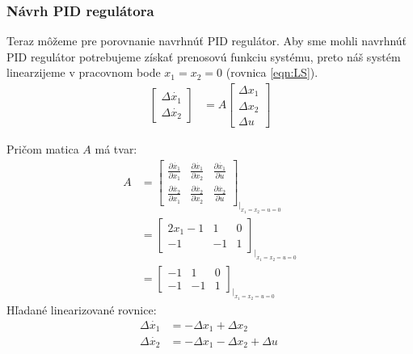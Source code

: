 \documentclass[../main.tex]{subfiles}
\begin{document}
\subsubsection*{Návrh PID regulátora}
Teraz môžeme pre porovnanie navrhnúť PID regulátor. Aby sme mohli navrhnúť PID regulátor potrebujeme získať prenosovú funkciu systému, preto náš systém linearzijeme v pracovnom bode $x_1 = x_2 = 0$ (rovnica \ref{eqn:LS}).
\begin{equation}
\begin{split} 
\begin{bmatrix} \Delta \dot{x_1} \\ \Delta \dot{x_2} \end{bmatrix}  & = A\begin{bmatrix} \Delta {x_1} \\ \Delta {x_2} \\ \Delta u \end{bmatrix}
 \end{split}
 \label{eqn:LS}
\end{equation}	

Pričom matica $A$ má tvar:
\begin{equation}
\begin{aligned} 
 A  & = \begin{bmatrix} \frac{\partial \dot{x_1}}{\partial x_1}& \frac{\partial \dot{x_1}}{\partial x_2}& \frac{\partial \dot{x_1}}{\partial u} \\ \frac{\partial \dot{x_2}}{\partial x_1}&\frac{\partial \dot{x_2}}{\partial x_2} & \frac{\partial \dot{x_2}}{\partial u}\end{bmatrix}_{|_{x_1 = x_2 = u = 0}} \\
 & = \begin{bmatrix} 2x_1-1 & 1 & 0 \\ -1 & -1 & 1 \end{bmatrix}_{|_{x_1 = x_2 = u = 0}} \\
  & = \begin{bmatrix} -1 & 1 & 0 \\ -1 & -1 & 1 \end{bmatrix}_{|_{x_1 = x_2 = u = 0}} \
 \end{aligned}
 \label{eqn:AL}
\end{equation}	
Hľadané linearizované rovnice: 
\begin{equation}
\begin{aligned} 
\Delta \dot{x_1}  &= -\Delta x_1 + \Delta x_2 \\
\Delta \dot{x_2} & = -\Delta x_1 - \Delta x_2 + \Delta u \
 \end{aligned}
 \label{eqn:LR}
\end{equation}	
\end{document}
